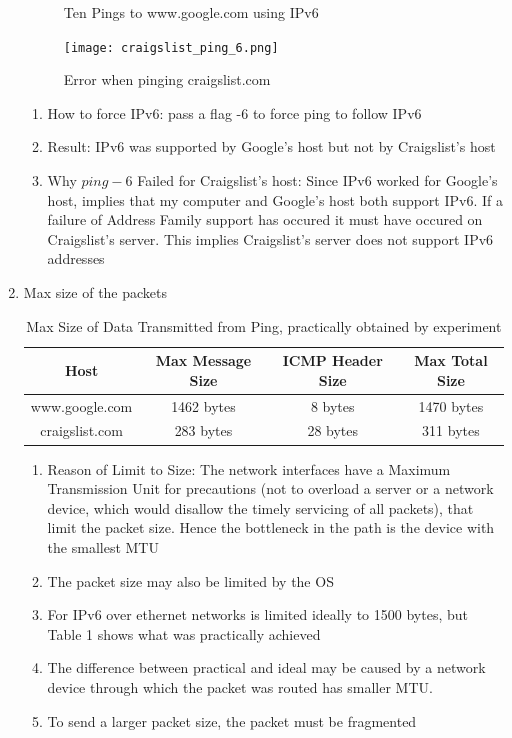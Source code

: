 \documentclass[12pt]{article}
\begin{document}
\begin{enumerate}
\begin{figure}[h!]
        \caption{Ten Pings to www.google.com using IPv6}
    \end{figure}
    \begin{figure}[h!]
        \centering
        \texttt{[image: craigslist\_ping\_6.png]}
        \caption{Error when pinging craigslist.com}
    \end{figure}
    \begin{enumerate}
        \item How to force IPv6: pass a flag -6 to force ping to follow IPv6
        \item Result: IPv6 was supported by Google's host but not by Craigslist's host
        \item Why $ping -6$ Failed for Craigslist's host: Since IPv6 worked for Google's host, implies that my computer and Google's host both support IPv6. If a failure of Address Family support has occured it must have occured on Craigslist's server. This implies Craigslist's server does not support IPv6 addresses
    \end{enumerate}
    \item Max size of the packets
    \begin{table}[h!]
        \centering
        \caption{Max Size of Data Transmitted from Ping, practically obtained by experiment}
        \begin{tabular}{|c|c|c|c|}
            \hline
            Host & Max Message Size & ICMP Header Size & Max Total Size \\
            \hline
            www.google.com & 1462 bytes & 8 bytes & 1470 bytes \\
            craigslist.com & 283 bytes & 28 bytes & 311 bytes \\
            \hline
        \end{tabular}
    \end{table}
    \begin{enumerate}
        \item Reason of Limit to Size: The network interfaces have a Maximum Transmission Unit for precautions (not to overload a server or a network device, which would disallow the timely servicing of all packets), that limit the packet size. Hence the bottleneck in the path is the device with the smallest MTU 
        \item The packet size may also be limited by the OS
        \item For IPv6 over ethernet networks is limited ideally to 1500 bytes, but Table 1 shows what was practically achieved 
        \item The difference between practical and ideal may be caused by a network device through which the packet was routed has smaller MTU.
        \item To send a larger packet size, the packet must be fragmented
    \end{enumerate}
\end{enumerate}
\end{document}
